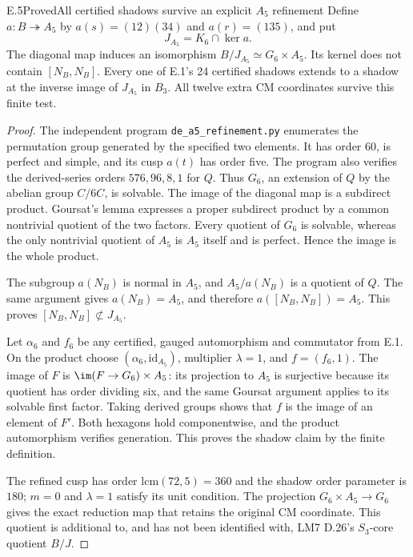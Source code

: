 \begin{statement}{E.5}{Proved}{All certified shadows survive an explicit $A_5$ refinement}
Define $a:B\twoheadrightarrow A_5$ by
$a(s)=(12)(34)$ and $a(r)=(135)$, and put
\[
 J_{A_5}=K_6\cap\ker a.
\]
The diagonal map induces an isomorphism
$B/J_{A_5}\simeq G_6\times A_5$. Its kernel does not contain
$[N_B,N_B]$. Every one of E.1's 24 certified shadows extends to a
shadow at the inverse image of $J_{A_5}$ in $B_3$. All twelve extra
CM coordinates survive this finite test.
\end{statement}
\begin{proof}
The independent program \texttt{de\_a5\_refinement.py} enumerates
the permutation group generated by the specified two elements.
It has order 60, is perfect and simple, and its cusp $a(t)$ has
order five. The program also verifies the derived-series orders
$576,96,8,1$ for $Q$. Thus $G_6$, an extension of $Q$ by the
abelian group $C/6C$, is solvable. The image of the diagonal map
is a subdirect product. Goursat's lemma expresses a proper subdirect
product by a common nontrivial quotient of the two factors. Every
quotient of $G_6$ is solvable, whereas the only nontrivial quotient
of $A_5$ is $A_5$ itself and is perfect. Hence the image is the
whole product.

The subgroup $a(N_B)$ is normal in $A_5$, and
$A_5/a(N_B)$ is a quotient of $Q$. The same argument gives
$a(N_B)=A_5$, and therefore $a([N_B,N_B])=A_5$.
This proves $[N_B,N_B]\not\subset J_{A_5}$.

Let $\alpha_6$ and $f_6$ be any certified, gauged automorphism and
commutator from E.1. On the product choose
$(\alpha_6,\mathrm{id}_{A_5})$, multiplier $\lambda=1$, and
$f=(f_6,1)$. The image of $F$ is
$\im(F\to G_6)\times A_5$: its projection to $A_5$ is surjective
because its quotient has order dividing six, and the same Goursat
argument applies to its solvable first factor. Taking derived groups
shows that $f$ is the image of an element of $F'$. Both hexagons hold
componentwise, and the product automorphism verifies generation.
This proves the shadow claim by the finite definition.

The refined cusp has order $\mathrm{lcm}(72,5)=360$ and the shadow
order parameter is $180$; $m=0$ and $\lambda=1$ satisfy its unit
condition. The projection $G_6\times A_5\to G_6$ gives the exact
reduction map that retains the original CM coordinate. This quotient
is additional to, and has not been identified with, LM7 D.26's
$S_3$-core quotient $B/J$.
\end{proof}

